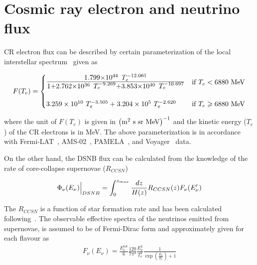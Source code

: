 \documentclass[11pt,prd,twocolumn,nofootinbib,reprint,superscriptaddress,longbibliography,colorlinks=true,citecolor=blue]{revtex4-1}
\def\bea{\begin{eqnarray}}
\def\eea{\end{eqnarray}}
\begin{document}
\section{Cosmic ray electron and neutrino flux}
\label{Sec:neutrino_flux}
CR electron flux can be described by certain parameterization of the local interstellar spectrum~\cite{Boschini:2018zdv} given as
\begin{widetext}
\begin{align}
  F(T_e) = \begin{cases}
     \mbox{\Large\( \frac{1.799 \times 10^{44}~ T_e^{-12.061}}{1+ 2.762 \times 10^{36}~ T_e^{-9.269} + 3.853 \times 10^{40}~ T_e^{-10.697}} \)} & \text{if $T_e < 6880$ MeV} \\
   \mbox{\tiny\( \)} & \mbox{\tiny\( \)} \\
      3.259 \times 10^{10}~T_e^{-3.505} + 3.204 \times 10^{5}~T_e^{-2.620} & \text{if $T_e \geqslant 6880$ MeV}
    \end{cases}
\label{Eq:CRe_flux_parameterization}
\end{align}
\end{widetext}
where the unit of $F(T_e)$ is given in $\rm{\left(m^2~s~sr~MeV \right)^{-1}}$ and the kinetic energy ($T_e$) of the CR electrons is in MeV. The above parameterization is in accordance with Fermi-LAT~\cite{Fermi-LAT:2011baq,Fermi-LAT:2009yfs,Fermi-LAT:2010fit,Fermi-LAT:2017bpc}, AMS-02~\cite{AMS:2014gdf}, PAMELA~\cite{PAMELA:2011bbe,CALET:2017uxd}, and Voyager~\cite{Cummings:2016pdr,Stone:2013} data.  
 
On the other hand, the DSNB flux can be calculated from the knowledge of the rate of core-collapse supernovae ($R_{CCSN}$)~\cite{Beacom:2010kk, Horiuchi:2008jz}
 
 \bea
\Bigl. \Phi_{\nu}(E_\nu)\Bigr\vert_{DSNB} = \int_0^{z_{max}} \frac{dz}{H(z)} R_{CCSN}(z) F_\nu(E'_\nu)
 \eea
 
 The $R_{CCSN}$ is a function of star formation rate and has been calculated following~\cite{Lunardini:2010ab}. The observable effective spectra of the neutrinos emitted from supernovae, is assumed to be of Fermi-Dirac form and approximately given for each flavour as~\cite{Beacom:2010kk,Lunardini:2010ab}
 \bea
 F_\nu(E_\nu) = \frac{E_\nu^{tot}}{6} \frac{120}{7 \pi^4} \frac{E_\nu^2}{T_\nu^4} \frac{1}{\exp(\frac{E_\nu}{T_\nu}) + 1}
 \eea
 
\end{document}
